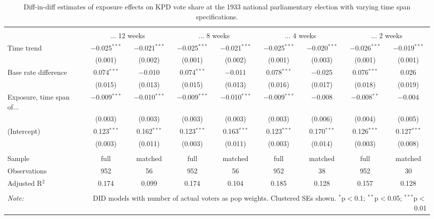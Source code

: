
\begin{table}[!htbp] \centering 
  \caption{Diff-in-diff estimates of exposure effects on KPD vote share at the 1933 national parliamentary election with varying time span specifications.\vspace{-.25cm}} 
  \label{tab:nsdap-voteshare-kpd-timespan-dd-1933} 
\scriptsize 
\begin{tabular}{@{\extracolsep{5pt}}lcccccccc} 
\\[-1.8ex]\hline 
\hline \\[-1.8ex] 
 & \multicolumn{2}{c}{... 12 weeks} & \multicolumn{2}{c}{... 8 weeks} & \multicolumn{2}{c}{... 4 weeks} & \multicolumn{2}{c}{... 2 weeks} \\ 
 \cmidrule(r){2-3}\cmidrule(r){4-5}\cmidrule(r){6-7}\cmidrule(r){8-9}Time trend & $-$0.025$^{***}$ & $-$0.021$^{***}$ & $-$0.025$^{***}$ & $-$0.021$^{***}$ & $-$0.025$^{***}$ & $-$0.020$^{***}$ & $-$0.026$^{***}$ & $-$0.019$^{***}$ \\ 
  & (0.001) & (0.002) & (0.001) & (0.002) & (0.001) & (0.003) & (0.001) & (0.001) \\ 
  Base rate difference & 0.074$^{***}$ & $-$0.010 & 0.074$^{***}$ & $-$0.011 & 0.078$^{***}$ & $-$0.025 & 0.076$^{***}$ & 0.026 \\ 
  & (0.015) & (0.013) & (0.015) & (0.013) & (0.016) & (0.017) & (0.018) & (0.019) \\ 
  Exposure, time span of... & $-$0.009$^{***}$ & $-$0.010$^{***}$ & $-$0.009$^{***}$ & $-$0.010$^{***}$ & $-$0.009$^{***}$ & $-$0.008 & $-$0.008$^{**}$ & $-$0.004 \\ 
  & (0.003) & (0.003) & (0.003) & (0.003) & (0.003) & (0.006) & (0.004) & (0.005) \\ 
  (Intercept) & 0.123$^{***}$ & 0.162$^{***}$ & 0.123$^{***}$ & 0.163$^{***}$ & 0.123$^{***}$ & 0.170$^{***}$ & 0.126$^{***}$ & 0.127$^{***}$ \\ 
  & (0.003) & (0.011) & (0.003) & (0.011) & (0.003) & (0.014) & (0.003) & (0.008) \\ 
 \hline \\[-1.8ex] 
Sample & full & matched & full & matched & full & matched & full & matched \\ 
Observations & 952 & 56 & 952 & 56 & 952 & 38 & 952 & 30 \\ 
Adjusted R$^{2}$ & 0.174 & 0.099 & 0.174 & 0.104 & 0.185 & 0.128 & 0.157 & 0.128 \\ 
\hline 
\hline \\[-1.8ex] 
\textit{Note:}  & \multicolumn{8}{r}{DID models with number of actual voters as pop weights. Clustered SEs shown. $^{*}$p$<$0.1; $^{**}$p$<$0.05; $^{***}$p$<$0.01} \\ 
\end{tabular} 
\end{table} 

